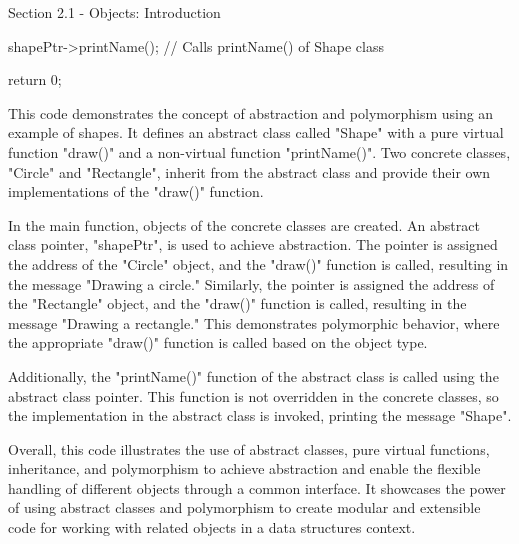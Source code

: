 \begin{notes}{Section 2.1 - Objects: Introduction}
\begin{highlight}
\begin{code}[C++]
{        shapePtr->printName();  // Calls printName() of Shape class
        
        return 0;
    }
    \end{code}
        This code demonstrates the concept of abstraction and polymorphism using an example of shapes. It defines an abstract class called "Shape" with a pure virtual function "draw()" and a non-virtual function "printName()". Two concrete classes, 
        "Circle" and "Rectangle", inherit from the abstract class and provide their own implementations of the "draw()" function.
    
        In the main function, objects of the concrete classes are created. An abstract class pointer, "shapePtr", is used to achieve abstraction. The pointer is assigned the address of the "Circle" object, and the "draw()" function is called, resulting
        in the message "Drawing a circle." Similarly, the pointer is assigned the address of the "Rectangle" object, and the "draw()" function is called, resulting in the message "Drawing a rectangle." This demonstrates polymorphic behavior, where the
        appropriate "draw()" function is called based on the object type.
    
        Additionally, the "printName()" function of the abstract class is called using the abstract class pointer. This function is not overridden in the concrete classes, so the implementation in the abstract class is invoked, printing the message 
        "Shape".
    
        Overall, this code illustrates the use of abstract classes, pure virtual functions, inheritance, and polymorphism to achieve abstraction and enable the flexible handling of different objects through a common interface. It showcases the power 
        of using abstract classes and polymorphism to create modular and extensible code for working with related objects in a data structures context.
    \end{highlight}
\end{notes}

